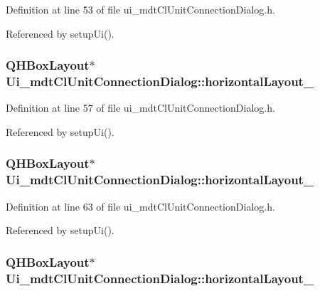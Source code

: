 Definition at line 53 of file ui\-\_\-mdt\-Cl\-Unit\-Connection\-Dialog.\-h.



Referenced by setup\-Ui().

\hypertarget{class_ui__mdt_cl_unit_connection_dialog_a610262bd8de01128d37494e0c8c56705}{
\subsubsection[{horizontal\-Layout\-\_\-2}]{\setlength{\rightskip}{0pt plus 5cm}Q\-H\-Box\-Layout$\ast$ Ui\-\_\-mdt\-Cl\-Unit\-Connection\-Dialog\-::horizontal\-Layout\-\_}}\label{class_ui__mdt_cl_unit_connection_dialog_a610262bd8de01128d37494e0c8c56705}


Definition at line 57 of file ui\-\_\-mdt\-Cl\-Unit\-Connection\-Dialog.\-h.



Referenced by setup\-Ui().

\hypertarget{class_ui__mdt_cl_unit_connection_dialog_ac21c3b0a11aa9aa26acb765165a6dabf}{
\subsubsection[{horizontal\-Layout\-\_\-3}]{\setlength{\rightskip}{0pt plus 5cm}Q\-H\-Box\-Layout$\ast$ Ui\-\_\-mdt\-Cl\-Unit\-Connection\-Dialog\-::horizontal\-Layout\-\_}}\label{class_ui__mdt_cl_unit_connection_dialog_ac21c3b0a11aa9aa26acb765165a6dabf}


Definition at line 63 of file ui\-\_\-mdt\-Cl\-Unit\-Connection\-Dialog.\-h.



Referenced by setup\-Ui().

\hypertarget{class_ui__mdt_cl_unit_connection_dialog_a1570fc70dedf7422959cd5cb1a6680ba}{
\subsubsection[{horizontal\-Layout\-\_\-4}]{\setlength{\rightskip}{0pt plus 5cm}Q\-H\-Box\-Layout$\ast$ Ui\-\_\-mdt\-Cl\-Unit\-Connection\-Dialog\-::horizontal\-Layout\-\_}}\label{class_ui__mdt_cl_unit_connection_dialog_a1570fc70dedf7422959cd5cb1a6680ba}


